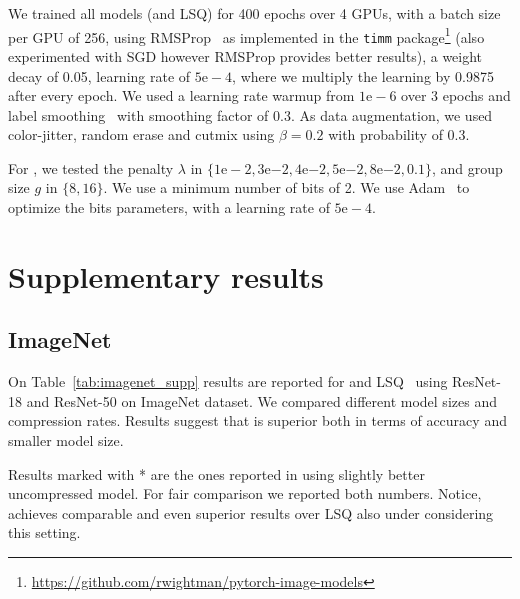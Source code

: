 We trained all models (\diffq and LSQ) for 400 epochs over 4 GPUs, with a batch size per GPU of 256, using  RMSProp~\cite{tieleman2012lecture} as implemented in the \texttt{timm} package\footnote{\url{https://github.com/rwightman/pytorch-image-models}} (also experimented with SGD however RMSProp provides better results), a weight decay of 0.05, learning rate of $5\mathrm{e}{-}4$, where we multiply the learning by 0.9875 after every epoch. We used a learning rate warmup from $1\mathrm{e}{-}6$ over 3 epochs and label smoothing~\citep{szegedy2016rethinking} with smoothing factor of 0.3. As data augmentation, we used color-jitter, random erase and cutmix using $\beta=0.2$ with probability of 0.3.

For \diffq, we tested the penalty $\lambda$ in $\{1\mathrm{e}{-}2, 3\mathrm{e}{-2}, 4\mathrm{e}{-2}, 5\mathrm{e}{-2}, 8\mathrm{e}{-2}, 0.1\}$, and group size $g$ in $\{8, 16\}$. We use a minimum number of bits of 2. We use Adam~\citep{adam} to optimize the bits parameters, with a learning rate of $5\mathrm{e}{-}{4}$.

\section{Supplementary results}
\label{app:results}

\subsection{ImageNet}
\label{supp:imagenet}
On Table~\ref{tab:imagenet_supp} results are reported for \diffq and LSQ~\cite{esser2020learned} using ResNet-18 and ResNet-50 on ImageNet dataset. We compared different model sizes and compression rates. Results suggest that \diffq is superior both in terms of accuracy and smaller model size. 

Results marked with * are the ones reported in \cite{esser2020learned} using slightly better uncompressed model. For fair comparison we reported both numbers. Notice, \diffq achieves comparable and even superior results over LSQ also under considering this setting.

